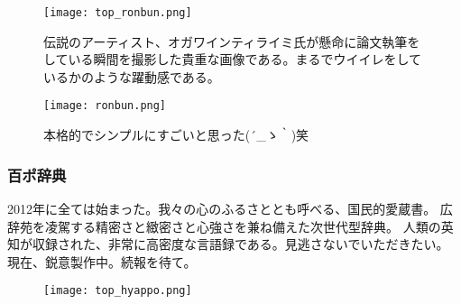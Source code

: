 \begin{figure}[H]
  \centering
  \texttt{[image: top\_ronbun.png]}
  \caption{伝説のアーティスト、オガワインティライミ氏が懸命に論文執筆をしている瞬間を撮影した貴重な画像である。まるでウイイレをしているかのような躍動感である。}
\label{top_ronbun}
\end{figure}

\begin{figure}[H]
  \centering
  \texttt{[image: ronbun.png]}
  \caption{本格的でシンプルにすごいと思った\sf (´\_ゝ｀)笑}
\label{ronbun}
\end{figure}

\subsubsection{百ポ辞典}
2012年に全ては始まった。我々の心のふるさととも呼べる、国民的愛蔵書。 広辞苑を凌駕する精密さと緻密さと心強さを兼ね備えた次世代型辞典。 人類の英知が収録された、非常に高密度な言語録である。見逃さないでいただきたい。\\
現在、鋭意製作中。続報を待て。\\

\begin{figure}[H]
  \centering
  \texttt{[image: top\_hyappo.png]}
  \caption{}
\label{top_hyappo}
\end{figure}

